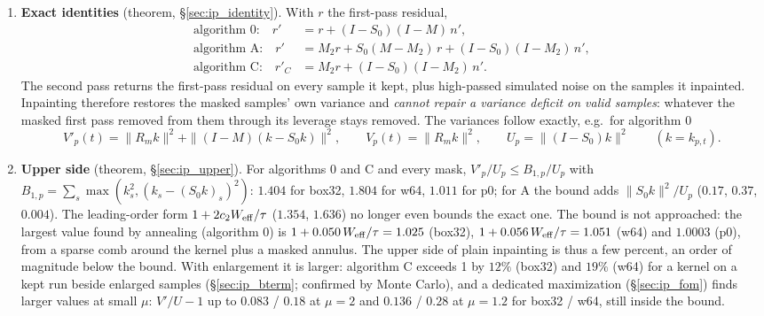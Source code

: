 \documentclass{article}
\numberwithin{equation}{section}   %
\def\nn{\nonumber}
\begin{document}
\begin{enumerate}

\item {\bf Exact identities} (theorem, \S\ref{sec:ip_identity}).  With $r$ the first-pass residual,
\begin{align}
\mbox{algorithm 0:}\quad r' &= r + (I - S_0)(I - M)\,n' , \nn \\
\mbox{algorithm A:}\quad r' &= M_2 r + S_0 (M - M_2)\, r + (I - S_0)(I - M_2)\,n' , \nn \\
\mbox{algorithm C:}\quad r'_C &= M_2 r + (I - S_0)(I - M_2)\,n' .
\label{eq:ip_identities}
\end{align}
The second pass returns the first-pass residual on every sample it kept, plus high-passed simulated
noise on the samples it inpainted.  Inpainting therefore restores the masked samples' own variance and
{\em cannot repair a variance deficit on valid samples}: whatever the masked first pass removed from them
through its leverage stays removed.  The variances follow exactly, e.g.\ for algorithm 0
\begin{equation}
V'_p(t) = \|R_m k\|^2 + \|(I - M)(k - S_0 k)\|^2, \qquad
V_p(t) = \|R_m k\|^2, \qquad U_p = \|(I - S_0)k\|^2 \qquad (k = k_{p,t}) .
\label{eq:ip_var0}
\end{equation}

\item {\bf Upper side} (theorem, \S\ref{sec:ip_upper}).  For algorithms 0 and C and every mask,
$V'_p/U_p \le B_{1,p}/U_p$ with $B_{1,p} = \sum_s \max(k_s^2, (k_s - (S_0k)_s)^2)$: $1.404$ for box32,
$1.804$ for w64, $1.011$ for p0; for A the bound adds $\|S_0k\|^2/U_p$ ($0.17$, $0.37$, $0.004$).  The
leading-order form $1 + 2c_2 W_{\rm eff}/\tau$ ($1.354$, $1.636$) no longer even bounds the exact one.
The bound is not approached: the largest value found by annealing (algorithm 0) is
$1 + 0.050\,W_{\rm eff}/\tau = 1.025$ (box32), $1 + 0.056\,W_{\rm eff}/\tau = 1.051$ (w64) and $1.0003$
(p0), from a sparse comb around the kernel plus a masked annulus.  The upper side of plain inpainting is
thus a few percent, an order of magnitude below the bound.  With enlargement it is larger: algorithm C
exceeds 1 by $12\%$ (box32) and $19\%$ (w64) for a kernel on a kept run beside enlarged samples
(\S\ref{sec:ip_bterm}; confirmed by Monte Carlo), and a dedicated maximization (\S\ref{sec:ip_fom}) finds
larger values at small $\mu$: $V'/U - 1$ up to $0.083$ / $0.18$ at $\mu = 2$ and $0.136$ / $0.28$ at
$\mu = 1.2$ for box32 / w64, still inside the bound.


\end{enumerate}
\end{document}
